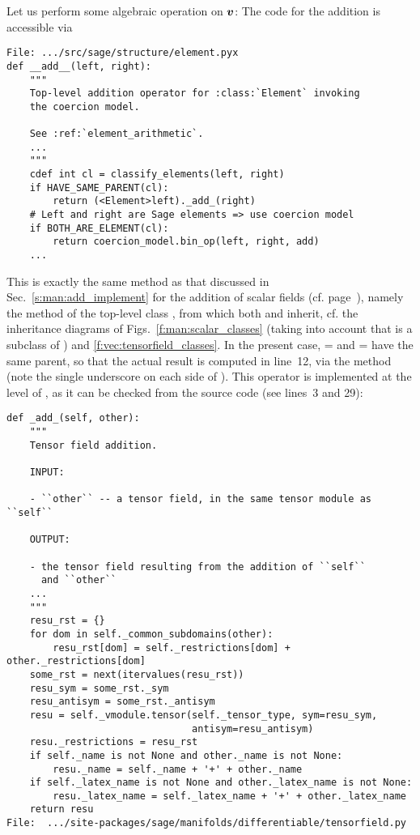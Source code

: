 Let us perform some algebraic operation on $\bm{v}$:
The code for the addition is accessible via
\begin{lstlisting}
File: .../src/sage/structure/element.pyx
def __add__(left, right):
    """
    Top-level addition operator for :class:`Element` invoking
    the coercion model.

    See :ref:`element_arithmetic`.
    ...
    """
    cdef int cl = classify_elements(left, right)
    if HAVE_SAME_PARENT(cl):
        return (<Element>left)._add_(right)
    # Left and right are Sage elements => use coercion model
    if BOTH_ARE_ELEMENT(cl):
        return coercion_model.bin_op(left, right, add)
    ...
\end{lstlisting}
This is exactly the same method  as that discussed in
Sec.~\ref{s:man:add_implement} for the addition of scalar fields (cf. page~\pageref{p:man:list___add__}), namely
the method  of the top-level class , from
which both  and  inherit, cf. the inheritance
diagrams of Figs.~\ref{f:man:scalar_classes} (taking into account that
 is a subclass of )
and \ref{f:vec:tensorfield_classes}.
In the present case,  =  and  = 
have the same parent, so that the actual result is computed in line~12,
via the method 
(note the single underscore on each side of ). This operator is
implemented at the level of , as it can be checked from the source code
(see lines~3 and 29):
\begin{lstlisting}
def _add_(self, other):
    """
    Tensor field addition.

    INPUT:

    - ``other`` -- a tensor field, in the same tensor module as ``self``

    OUTPUT:

    - the tensor field resulting from the addition of ``self``
      and ``other``
    ...
    """
    resu_rst = {}
    for dom in self._common_subdomains(other):
        resu_rst[dom] = self._restrictions[dom] + other._restrictions[dom]
    some_rst = next(itervalues(resu_rst))
    resu_sym = some_rst._sym
    resu_antisym = some_rst._antisym
    resu = self._vmodule.tensor(self._tensor_type, sym=resu_sym,
                                antisym=resu_antisym)
    resu._restrictions = resu_rst
    if self._name is not None and other._name is not None:
        resu._name = self._name + '+' + other._name
    if self._latex_name is not None and other._latex_name is not None:
        resu._latex_name = self._latex_name + '+' + other._latex_name
    return resu
File:  .../site-packages/sage/manifolds/differentiable/tensorfield.py
\end{lstlisting}
